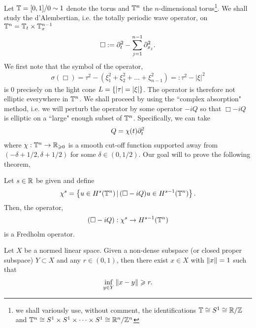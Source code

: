 \documentclass{article}
\title{}
\date{}
\begin{document}
Let $\T = [0,1] / 0 \sim 1$ denote the torus and $\T^n$ the $n$-dimensional torus\footnote{we shall variously use, without comment, the identifications $\T \cong S^1 \cong \R / \Z$ and $\T^n \cong S^1 \times S^1 \times \dots \times S^1 \cong \R^n / \Z^n$}. We shall study the d'Alembertian, i.e. the totally periodic wave operator, on $\T^n = \T_t \times \T_x^{n - 1}$ 
\begin{align}\label{eq: d'Alembertian}
\Box := \p_t^2 - \sum_{j = 1}^{n -1} \p_{x_j}^2. 
\end{align}
We first note that the symbol of the operator, 
\begin{align*}
\sigma(\Box) = \tau^2 - (\xi_1^2 + \xi_2^2 + \dots + \xi_{n -1}^2) =: \tau^2 - |\xi|^2
\end{align*}
is $0$ precisely on the light cone $L = \set{|\tau| = |\xi|}$. The operator is therefore not elliptic everywhere in $\T^n$.  We shall proceed by using the ``complex absorption" method, i.e. we will perturb the operator by some operator $-iQ$ so that $\Box - iQ$ is elliptic on a ``large" enough subset of $\T^n$. Specifically, we can take 
\begin{align}\label{eq: perturbation operator}
Q = \chi(t)\p_t^2
\end{align}
where $\chi: \T^n \to \R_{\geq 0}$ is a smooth cut-off function supported away from $(-\delta + 1/2, \delta + 1/2)$ for some $\delta \in (0, 1/2)$. Our goal will to prove the following theorem, 
\begin{ftheorem}
Let $s \in \R$ be given and define 
\begin{align*}
\chi^s = \set{u \in H^s(\T^n) \wh (\Box - i Q)u \in H^{s - 1}(\T^n)}. 
\end{align*}
Then, the operator, 
\begin{align*}
(\Box - iQ): \chi^s \to H^{s - 1}(\T^n)
\end{align*}
is a Fredholm operator. 
\end{ftheorem}


\begin{flemma}
Let $X$ be a normed linear space. Given a non-dense subspace (or closed proper subspace) $Y \subset X$ and any $r \in (0, 1)$, then there exist $x \in X$ with $\norm[x] = 1$ such that 
\begin{align*}
\inf_{y \in Y} \norm[x - y] \geq r. 
\end{align*}
\end{flemma}
\end{document}
